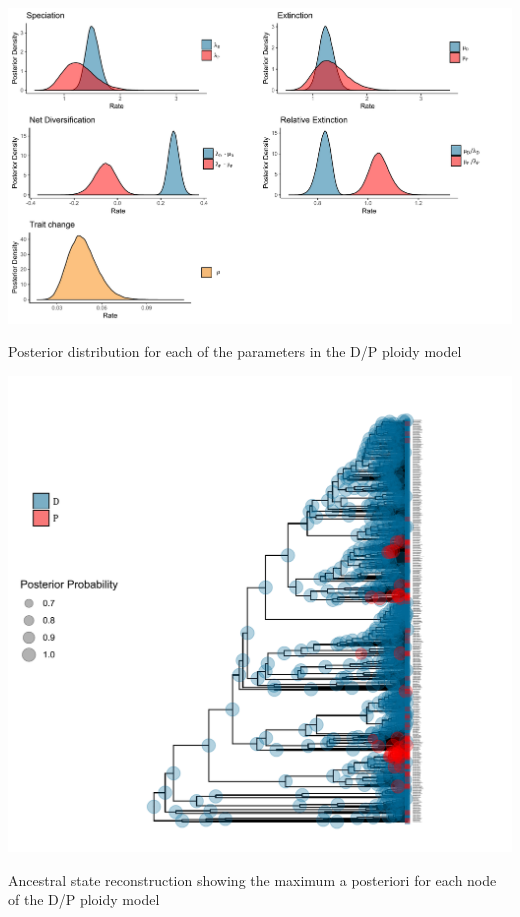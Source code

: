 \begin{suppfigure}
\includegraphics[width=\textwidth]{bisseDPnodipposteriordist.pdf}
\caption{Posterior distribution for each of the parameters in the D/P ploidy model} %
\label{suppfigure:DPnodip}
\end{suppfigure}

\begin{suppfigure}
\includegraphics[width=\textwidth]{asrDP.pdf}
\caption{Ancestral state reconstruction showing the maximum a posteriori for each node of the D/P ploidy model} %
\label{suppfigure:DPnodipasr}
\end{suppfigure}

